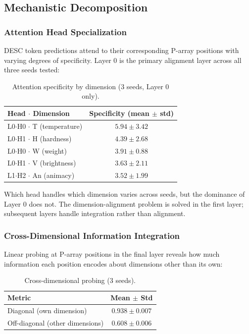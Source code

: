 \documentclass{article}
\begin{document}
\subsection{Mechanistic Decomposition}

\subsubsection{Attention Head Specialization}

DESC token predictions attend to their corresponding P-array positions with varying degrees of specificity. Layer 0 is the primary alignment layer across all three seeds tested:

\begin{table}[!ht]
\centering
\small
\begin{tabular}{lc}
\toprule
Head $\cdot$ Dimension & Specificity (mean $\pm$ std) \\
\midrule
L0$\cdot$H0 $\cdot$ T (temperature) & $5.94 \pm 3.42$ \\
L0$\cdot$H1 $\cdot$ H (hardness) & $4.39 \pm 2.68$ \\
L0$\cdot$H0 $\cdot$ W (weight) & $3.91 \pm 0.88$ \\
L0$\cdot$H1 $\cdot$ V (brightness) & $3.63 \pm 2.11$ \\
L1$\cdot$H2 $\cdot$ An (animacy) & $3.52 \pm 1.99$ \\
\bottomrule
\end{tabular}
\caption{Attention specificity by dimension (3 seeds, Layer 0 only).}
\label{tab:attention}
\end{table}

Which head handles which dimension varies across seeds, but the dominance of Layer 0 does not. The dimension-alignment problem is solved in the first layer; subsequent layers handle integration rather than alignment.

\subsubsection{Cross-Dimensional Information Integration}

Linear probing at P-array positions in the final layer reveals how much information each position encodes about dimensions other than its own:

\begin{table}[htbp]
\centering
\small
\begin{tabular}{lc}
\toprule
Metric & Mean $\pm$ Std \\
\midrule
Diagonal (own dimension) & $0.938 \pm 0.007$ \\
Off-diagonal (other dimensions) & $0.608 \pm 0.006$ \\
\bottomrule
\end{tabular}
\caption{Cross-dimensional probing (3 seeds).}
\label{tab:crossdim}
\end{table}
\end{document}
